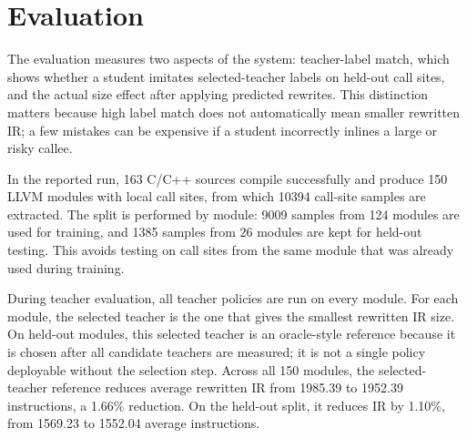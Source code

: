 \documentclass[12pt, a4paper]{report}
\begin{document}

\chapter{Evaluation}

The evaluation measures two aspects of the system: teacher-label match, which
shows whether a student imitates selected-teacher labels on held-out call sites,
and the actual size effect after applying predicted rewrites. This distinction
matters because high label match does not automatically mean smaller rewritten
IR; a few mistakes can be expensive if a student incorrectly inlines a large or
risky callee.

In the reported run, 163 C/C++ sources compile successfully and produce 150 LLVM
modules with local call sites, from which 10394 call-site samples are extracted.
The split is performed by module: 9009 samples from 124 modules are used for
training, and 1385 samples from 26 modules are kept for held-out testing. This
avoids testing on call sites from the same module that was already used during
training.

During teacher evaluation, all teacher policies are run on every module. For
each module, the selected teacher is the one that gives the smallest rewritten
IR size. On held-out modules, this selected teacher is an oracle-style reference
because it is chosen after all candidate teachers are measured; it is not a
single policy deployable without the selection step. Across all 150 modules, the
selected-teacher reference reduces average rewritten IR from 1985.39 to 1952.39
instructions, a 1.66\% reduction. On the held-out split, it reduces IR by
1.10\%, from 1569.23 to 1552.04 average instructions.
\end{document}
